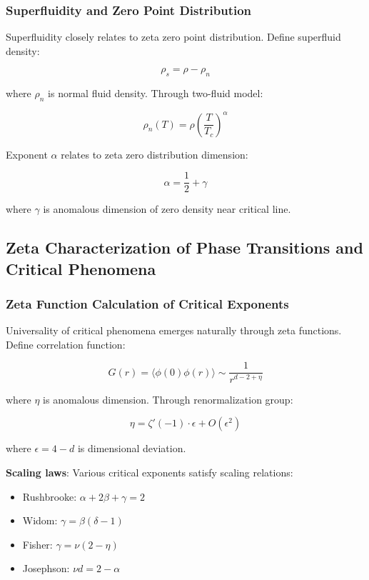 \documentclass[12pt,a4paper]{article}
\begin{document}
\subsubsection{Superfluidity and Zero Point Distribution}

Superfluidity closely relates to zeta zero point distribution. Define superfluid density:

$$\rho_s = \rho - \rho_n$$

where $\rho_n$ is normal fluid density. Through two-fluid model:

$$\rho_n(T) = \rho \left(\frac{T}{T_c}\right)^{\alpha}$$

Exponent $\alpha$ relates to zeta zero distribution dimension:

$$\alpha = \frac{1}{2} + \gamma$$

where $\gamma$ is anomalous dimension of zero density near critical line.

\subsection{Zeta Characterization of Phase Transitions and Critical Phenomena}

\subsubsection{Zeta Function Calculation of Critical Exponents}

Universality of critical phenomena emerges naturally through zeta functions. Define correlation function:

$$G(r) = \langle \phi(0)\phi(r) \rangle \sim \frac{1}{r^{d-2+\eta}}$$

where $\eta$ is anomalous dimension. Through renormalization group:

$$\eta = \zeta'(-1) \cdot \epsilon + O(\epsilon^2)$$

where $\epsilon = 4 - d$ is dimensional deviation.

\textbf{Scaling laws}: Various critical exponents satisfy scaling relations:
\begin{itemize}
\item Rushbrooke: $\alpha + 2\beta + \gamma = 2$
\item Widom: $\gamma = \beta(\delta - 1)$
\item Fisher: $\gamma = \nu(2 - \eta)$
\item Josephson: $\nu d = 2 - \alpha$
\end{itemize}
\end{document}
